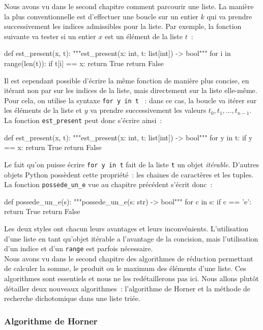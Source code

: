 \documentclass{magnoliaold}
\begin{document}
Nous avons vu dans le second chapitre comment parcourir une liste. La manière la plus conventionnelle
est d'effectuer une boucle sur un entier $k$ qui va prendre successivement les indices admissibles
pour la liste. Par exemple, la fonction suivante va tester si un entier $x$ est un élément de la
liste $t$~:
\begin{pythoncode}
def est_present(x, t):
    """est_present(x: int, t: list[int]) -> bool"""
    for i in range(len(t)):
        if t[i] == x:
            return True
    return False
\end{pythoncode}
Il est cependant possible d'écrire la même fonction de manière plus concise, en itérant
non par sur les indices de la liste, mais directement sur la liste elle-même. Pour cela, on
utilise la syntaxe \og \verb!for y in t! \fg~: dans ce cas, la boucle va itérer sur les éléments
de la liste et $y$ va prendre successivement les valeurs $t_0, t_1,\ldots,t_{n-1}$. La fonction \verb!est_present! peut donc s'écrire ainsi~:
\begin{pythoncode}
def est_present(x, t):
    """est_present(x: int, t: list[int]) -> bool"""
    for y in t:
        if y == x:
            return True
    return False
\end{pythoncode}
Le fait qu'on puisse écrire \og \verb!for y in t! \fg fait de la liste \verb!t! un objet \emph{itérable}.
D'autres objets Python possèdent cette propriété~: les chaines de caractères et les tuples. La fonction
\verb!possede_un_e! vue au chapitre précédent s'écrit donc~:
\begin{pythoncode}
def possede_un_e(s):
    """possede_un_e(s: str) -> bool"""
    for c in s:
        if c == 'e':
            return True
    return False
\end{pythoncode}
Les deux styles ont chacun leurs avantages et leurs inconvénients. L'utilisation d'une liste en tant
qu'objet itérable a l'avantage de la concision, mais l'utilisation d'un indice et d'un \verb!range! est parfois nécessaire.\\

Nous avons vu dans le second chapitre des algorithmes de réduction permettant de
calculer la somme, le produit ou le maximum des éléments d'une liste. Ces algorithmes sont essentiels
et nous ne les redétaillerons pas ici. Nous allons plutôt détailler deux nouveaux algorithmes~:
l'algorithme de Horner et la méthode de recherche dichotomique dans une liste triée.

\subsubsection{Algorithme de Horner}
\end{document}

